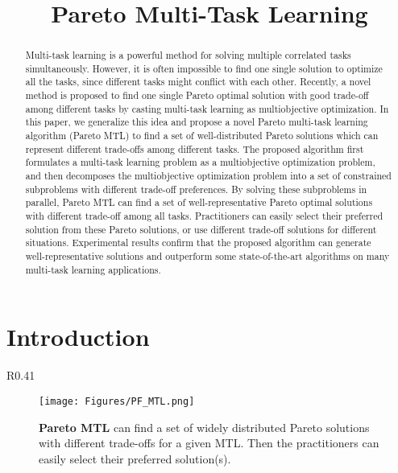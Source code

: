 \title{Pareto Multi-Task Learning}



\maketitle

\begin{abstract}
Multi-task learning is a powerful method for solving multiple correlated tasks simultaneously. However, it is often impossible to find one single solution to optimize all the tasks, since different tasks might conflict with each other. Recently, a novel method is proposed to find one single Pareto optimal solution with good trade-off among different tasks by casting multi-task learning as multiobjective optimization. In this paper, we generalize this idea and propose a novel Pareto multi-task learning algorithm (Pareto MTL) to find a set of well-distributed Pareto solutions which can represent different trade-offs among different tasks. The proposed algorithm first formulates a multi-task learning problem as a multiobjective optimization problem, and then decomposes the multiobjective optimization problem into a set of constrained subproblems with different trade-off preferences. By solving these subproblems in parallel, Pareto MTL can find a set of well-representative Pareto optimal solutions with different trade-off among all tasks. Practitioners can easily select their preferred solution from these Pareto solutions, or use different trade-off solutions for different situations.  Experimental results confirm that the proposed algorithm can generate well-representative solutions and outperform some state-of-the-art algorithms on many multi-task learning applications.
\end{abstract}

\section{Introduction}

\begin{wrapfigure}{R}{0.41\linewidth}
	\begin{minipage}{\linewidth}
    \begin{figure}[H]
	    \centering
	    \texttt{[image: Figures/PF\_MTL.png]}
	    \caption{\textbf{Pareto MTL} can find a set of widely distributed Pareto solutions with different trade-offs for a given MTL. Then the practitioners can easily select their preferred solution(s).}
        \label{MOPMTL}
    \end{figure}
	\end{minipage}
\end{wrapfigure}

